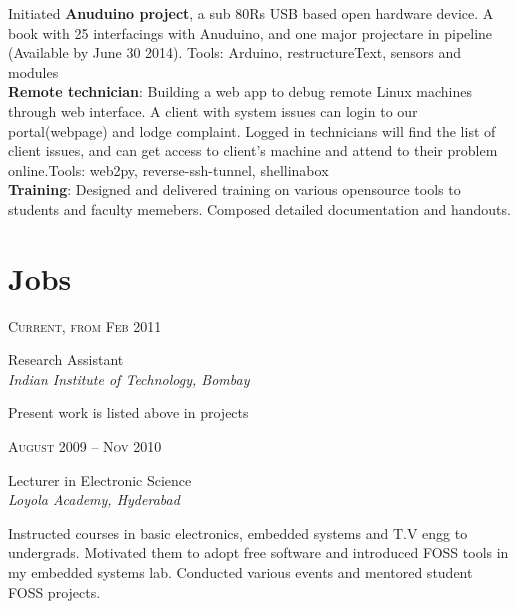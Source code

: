 \documentclass[10pt]{article} %
\begin{document}
{\begin{minipage}[t]{0.5\textwidth}
{Initiated \textbf{Anuduino project}, a sub 80Rs USB based open hardware device. A book with 25 interfacings with Anuduino, and one major projectare in pipeline (Available by June 30 2014). Tools: Arduino, restructureText, sensors and modules\\

\textbf{Remote technician}: Building a web app to debug remote Linux machines through web interface. A client with system issues can login to our portal(webpage) and lodge complaint. Logged in technicians will find the list of client issues, and can get access to client's machine and attend to their problem online.Tools: web2py, reverse-ssh-tunnel, shellinabox\\

\textbf{Training}: Designed and delivered training on various opensource tools to students and faculty memebers. Composed detailed documentation and handouts. 
}\\


\section{Jobs} 

{\raggedleft\textsc{Current, from Feb 2011}\par}

{
\raggedright\large Research Assistant\\
\textit{Indian Institute of Technology, Bombay}\\[5pt]}
\normalsize{Present work is listed above in projects}\\


{\raggedleft\textsc{August 2009 -- Nov 2010}\par}

{\raggedright\large  Lecturer in Electronic Science\\
\textit{Loyola Academy, Hyderabad}\\[5pt]}

\normalsize{Instructed courses in basic electronics, embedded systems and T.V engg to undergrads. Motivated them to adopt free software and introduced FOSS tools in my embedded systems lab. Conducted various events and mentored student FOSS projects.}\\


\end{minipage}}
\end{document}
